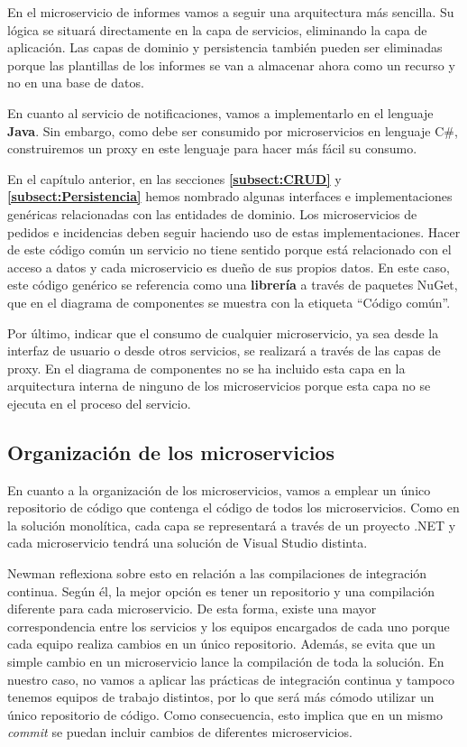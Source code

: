 \documentclass[11pt,spanish,listoffigures]{tfgetsinf}
\begin{document}
En el microservicio de informes vamos a seguir una arquitectura más sencilla. Su lógica se situará directamente en la capa de servicios, eliminando la capa de aplicación. Las capas de dominio y persistencia también pueden ser eliminadas porque las plantillas de los informes se van a almacenar ahora como un recurso y no en una base de datos. 

En cuanto al servicio de notificaciones, vamos a implementarlo en el lenguaje \textbf{Java}. Sin embargo, como debe ser consumido por microservicios en lenguaje C\#, construiremos un proxy en este lenguaje para hacer más fácil su consumo.

En el capítulo anterior, en las secciones \textbf{\ref{subsect:CRUD} } y \textbf{\ref{subsect:Persistencia} } hemos nombrado algunas interfaces e implementaciones genéricas relacionadas con las entidades de dominio. Los microservicios de pedidos e incidencias deben seguir haciendo uso de estas implementaciones. Hacer de este código común un servicio no tiene sentido porque está relacionado con el acceso a datos y cada microservicio es dueño de sus propios datos. En este caso, este código genérico se referencia como una \textbf{librería} a través de paquetes NuGet, que en el diagrama de componentes se muestra con la etiqueta ``Código común''.

Por último, indicar que el consumo de cualquier microservicio, ya sea desde la interfaz de usuario o desde otros servicios, se realizará a través de las capas de proxy. En el diagrama de componentes no se ha incluido esta capa en la arquitectura interna de ninguno de los microservicios porque esta capa no se ejecuta en el proceso del servicio.

\subsection{Organización de los microservicios}

En cuanto a la organización de los microservicios, vamos a emplear un único repositorio de código que contenga el código de todos los microservicios. Como en la solución monolítica, cada capa se representará a través de un proyecto .NET y cada microservicio tendrá una solución de Visual Studio distinta.

Newman \cite{Newman2015a} reflexiona sobre esto en relación a las compilaciones de integración continua. Según él, la mejor opción es tener un repositorio y una compilación diferente para cada microservicio. De esta forma, existe una mayor correspondencia entre los servicios y los equipos encargados de cada uno porque cada equipo realiza cambios en un único repositorio. Además, se evita que un simple cambio en un microservicio lance la compilación de toda la solución. En nuestro caso, no vamos a aplicar las prácticas de integración continua y tampoco tenemos equipos de trabajo distintos, por lo que será más cómodo utilizar un único repositorio de código. Como consecuencia, esto implica que en un mismo \textit{commit} se puedan incluir cambios de diferentes microservicios.
\end{document}

